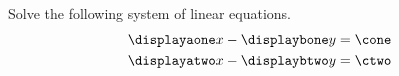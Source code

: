 









\pgfmathtruncatemacro{\money}{\lcmy/\bone}
\pgfmathtruncatemacro{\mtwoy}{\lcmy/\btwo}


\pgfmathtruncatemacro{\maone}{\money*\aone}
\pgfmathtruncatemacro{\matwo}{\mtwoy*\atwo}


\pgfmathtruncatemacro{\cone}{\aone*\x-\bone*\y}
\pgfmathtruncatemacro{\ctwo}{\atwo*\x-\btwo*\y}


\pgfmathtruncatemacro{\monecone}{\money*\cone}
\pgfmathtruncatemacro{\mtwoctwo}{\mtwoy*\ctwo}


\pgfmathtruncatemacro{\coefx}{\maone-\matwo}

\pgfmathtruncatemacro{\cthree}{\monecone-\mtwoctwo}


\pgfmathtruncatemacro{\aonetimesx}{\aone*\x}


\pgfmathtruncatemacro{\coneminusaonex}{\cone-\aone*\x}




\setcounter{equation}{0}



Solve the following system of linear equations.
\begin{align}
\displayaone x - \displaybone y &= \cone  \label{eq-I004-1}\\
\displayatwo x - \displaybtwo y &= \ctwo  \label{eq-I004-2}
\end{align}

